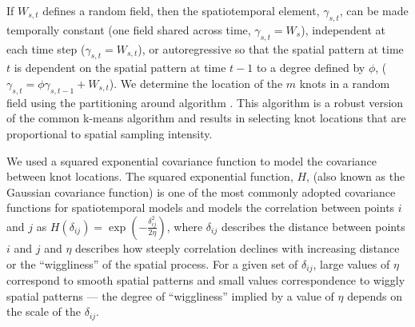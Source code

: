 \documentclass[12pt,english]{article}
\begin{document}
\begin{spacing}{1.25}
If $W_{s,t}$ defines a random field, then the spatiotemporal element,
$\gamma_{s,t}$, can be made temporally constant (one field shared across time,
$\gamma_{s,t} = W_{s}$), independent at each time step ($\gamma_{s,t} =
W_{s,t}$), or autoregressive so that the spatial pattern at time $t$ is
dependent on the spatial pattern at time $t-1$ to a degree defined by $\phi$,
($\gamma_{s,t} = \phi \gamma_{s,t-1} + W_{s,t}$).
We determine the location of the $m$ knots in a random field
using the partitioning around
algorithm \citep[the \texttt{pam} function in the R package
\textbf{cluster};][]{reynolds2006}. This algorithm is a robust version of the
common k-means algorithm and results in selecting knot locations that are
proportional to spatial sampling intensity.

We used a squared exponential covariance function to model the covariance
between knot locations. The squared exponential function, $H$, (also known as
the Gaussian covariance function) is one of the most commonly adopted
covariance functions for spatiotemporal models and models the correlation
between points $i$ and $j$ as $H(\delta_{ij}) = \exp
\left(-\frac{\delta_{ij}^2}{2 \eta} \right)$, where $\delta_{ij}$ describes the
distance between points $i$ and $j$ and $\eta$ describes how steeply
correlation declines with increasing distance or the ``wiggliness'' of the
spatial process. For a given set of $\delta_{ij}$, large values of $\eta$
correspond to smooth spatial patterns and small values correspondence to wiggly
spatial patterns --- the degree of ``wiggliness'' implied by a value of $\eta$
depends on the scale of the $\delta_{ij}$.


\end{spacing}
\end{document}
